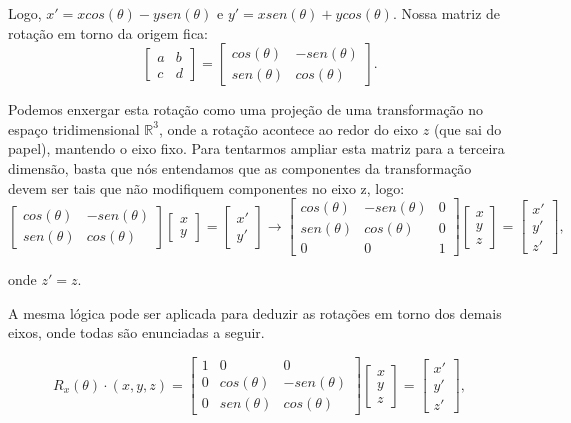 \documentclass[a4paper,12pt]{article}
\begin{document}
\begin{itemize}
	 	Logo, $x' = x cos(\theta) - y sen(\theta)$ e $y' = x sen(\theta) + y cos(\theta)$. Nossa matriz de rotação em torno da origem fica:
	 	$$
	 	\begin{bmatrix}
	 		a & b\\
	 		c & d
	 	\end{bmatrix}
	 	=
	 	\begin{bmatrix}
	 	cos(\theta) & -sen(\theta)\\
	 	sen(\theta) & cos(\theta)
	 	\end{bmatrix}.
	 	$$
	 	
	 	Podemos enxergar esta rotação como uma projeção de uma transformação no espaço tridimensional $\mathbb{R}^3$, onde a rotação acontece ao redor do eixo $z$ (que sai do papel), mantendo o eixo fixo. Para tentarmos ampliar esta matriz para a terceira dimensão, basta que nós entendamos que as componentes da transformação devem ser tais que não modifiquem componentes no eixo z, logo:
	 	$$
	 	\begin{bmatrix}
	 	cos(\theta) & -sen(\theta)\\
	 	sen(\theta) & cos(\theta)
	 	\end{bmatrix}
	 	\begin{bmatrix}
	 	x\\
	 	y
	 	\end{bmatrix}
	 	=
	 	\begin{bmatrix}
	 	x'\\
	 	y'
	 	\end{bmatrix}
	 	\longrightarrow
	 	\begin{bmatrix}
	 	cos(\theta) & -sen(\theta)&0\\
	 	sen(\theta) & cos(\theta)&0\\
	 	0 & 0 & 1
	 	\end{bmatrix}
	 	\begin{bmatrix}
	 	x\\
	 	y\\
	 	z
	 	\end{bmatrix}
	 	=
	 	\begin{bmatrix}
	 	x'\\
	 	y'\\
	 	z'
	 	\end{bmatrix},
	 	$$
	 	
	 	onde $z' = z$.
	 	
	 	A mesma lógica pode ser aplicada para deduzir as rotações em torno dos demais eixos, onde todas são enunciadas a seguir.
	 	
	 	$$
	 	R_x(\theta)\cdot(x,y,z) =
	 	\begin{bmatrix}
	 	1 & 0 & 0\\
	 	0&cos(\theta) & -sen(\theta)\\
	 	0&sen(\theta) & cos(\theta)
	 	\end{bmatrix}
	 	\begin{bmatrix}
	 	x\\
	 	y\\
	 	z
	 	\end{bmatrix}
	 	=
	 	\begin{bmatrix}
	 	x'\\
	 	y'\\
	 	z'
	 	\end{bmatrix},
	 	$$
	 	

\end{itemize}
\end{document}
